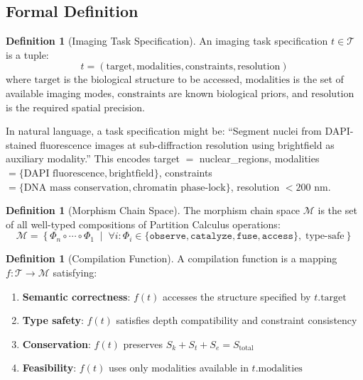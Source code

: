 \documentclass[11pt,twocolumn,a4paper]{article}
\theoremstyle{definition}
\newtheorem{definition}[theorem]{Definition}
\theoremstyle{remark}
\newcommand{\Sk}{S_k}
\newcommand{\St}{S_t}
\newcommand{\Se}{S_e}
\newcommand{\morphism}{\Phi}
\begin{document}
\subsection{Formal Definition}

\begin{definition}[Imaging Task Specification]
\label{def:task}
An imaging task specification $t \in \mathcal{T}$ is a tuple:
\begin{equation}
t = (\text{target}, \text{modalities}, \text{constraints}, \text{resolution})
\end{equation}
where $\text{target}$ is the biological structure to be accessed, $\text{modalities}$ is the set of available imaging modes, $\text{constraints}$ are known biological priors, and $\text{resolution}$ is the required spatial precision.
\end{definition}

In natural language, a task specification might be: ``Segment nuclei from DAPI-stained fluorescence images at sub-diffraction resolution using brightfield as auxiliary modality.'' This encodes target $=$ nuclear\_regions, modalities $= \{\text{DAPI fluorescence}, \text{brightfield}\}$, constraints $= \{\text{DNA mass conservation}, \text{chromatin phase-lock}\}$, resolution $< 200$ nm.

\begin{definition}[Morphism Chain Space]
\label{def:chain_space}
The morphism chain space $\mathcal{M}$ is the set of all well-typed compositions of Partition Calculus operations:
\begin{equation}
\mathcal{M} = \left\{ \morphism_n \circ \cdots \circ \morphism_1 \;\middle|\; \forall i: \morphism_i \in \{\texttt{observe}, \texttt{catalyze}, \texttt{fuse}, \texttt{access}\}, \; \text{type-safe} \right\}
\end{equation}
\end{definition}

\begin{definition}[Compilation Function]
A compilation function is a mapping $f: \mathcal{T} \to \mathcal{M}$ satisfying:
\begin{enumerate}
    \item \textbf{Semantic correctness}: $f(t)$ accesses the structure specified by $t.\text{target}$
    \item \textbf{Type safety}: $f(t)$ satisfies depth compatibility and constraint consistency
    \item \textbf{Conservation}: $f(t)$ preserves $\Sk + \St + \Se = S_{\mathrm{total}}$
    \item \textbf{Feasibility}: $f(t)$ uses only modalities available in $t.\text{modalities}$
\end{enumerate}
\end{definition}
\end{document}

